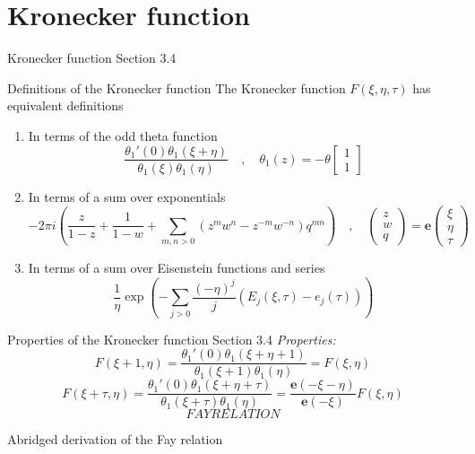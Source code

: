 \documentclass[11pt,aspectratio=169]{beamer}
\newcommand{\ee}[0]{\mathbf{e}}
\begin{document}
\section{Kronecker function}

\begin{frame}{Kronecker function}{\tiny \cite{BL13} Section 3.4}
    \begin{block}{Definitions of the Kronecker function}
        The Kronecker function $F(\xi,\eta,\tau)$ has equivalent definitions
        \begin{enumerate}
            \item In terms of the odd theta function
            \[\frac{\theta_1'(0)\theta_1(\xi+\eta)}{\theta_1(\xi)\theta_1(\eta)} \quad , \quad \theta_1(z) = -\theta\begin{bmatrix}1 \\ 1\end{bmatrix}\]
            \item In terms of a sum over exponentials
            \[-2\pi i \left(\frac{z}{1-z} + \frac{1}{1-w} + \sum_{m,n > 0} (z^m w^n - z^{-m} w^{-n}) q^{mn}\right) \quad , \quad \begin{pmatrix} z \\ w \\ q \end{pmatrix} = \ee \begin{pmatrix}\xi \\ \eta \\ \tau\end{pmatrix}\]
            \item In terms of a sum over Eisenstein functions and series
            \[\frac{1}{\eta} \exp\left(-\sum_{j > 0} \frac{(-\eta)^j}{j} (E_j(\xi,\tau) - e_j(\tau))\right)\]
        \end{enumerate}
    \end{block}
\end{frame}

\begin{frame}{Properties of the Kronecker function}{\tiny \cite{BL13} Section 3.4}
    \emph{Properties:}
    \[F(\xi+1,\eta) = \frac{\theta_1'(0)\theta_1(\xi+\eta+1)}{\theta_1(\xi+1)\theta_1(\eta)} = F(\xi,\eta)\]
    \[F(\xi+\tau,\eta) = \frac{\theta_1'(0)\theta_1(\xi+\eta+\tau)}{\theta_1(\xi+\tau)\theta_1(\eta)} = \frac{\ee(-\xi-\eta)}{\ee(-\xi)} F(\xi,\eta)\]
    \[FAY RELATION\]
\end{frame}

\begin{frame}{Abridged derivation of the Fay relation}

\end{frame}
\end{document}
